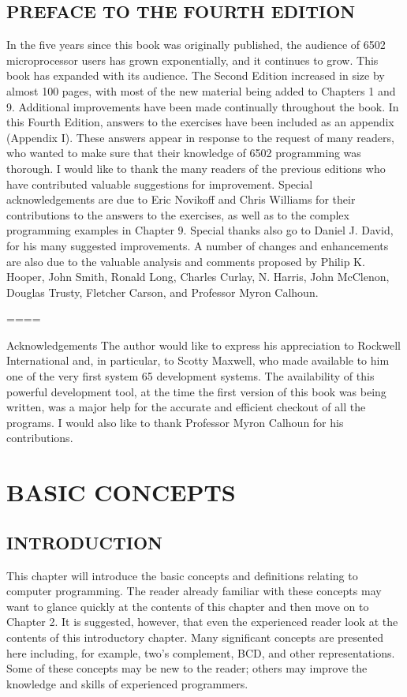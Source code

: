 \documentclass{book}
\begin{document}
\section*{PREFACE TO THE FOURTH EDITION}

In the five years since this book was originally published, the audience of 6502 microprocessor users has grown exponentially, and it continues
to grow. This book has expanded with its audience.
The Second Edition increased in size by almost 100 pages, with most of the new material being added to Chapters 1 and 9. Additional improvements have been made continually throughout the book. In this Fourth Edition, answers to the exercises have been included as an appendix (Appendix I). These answers appear in response to the request of many readers, who wanted to make sure that their knowledge of 6502 programming was thorough.
I would like to thank the many readers of the previous editions who have contributed valuable suggestions for improvement. Special acknowledgements are due to Eric Novikoff and Chris Williams for their contributions to the answers to the exercises, as well as to the complex programming examples in Chapter 9. Special thanks also go to Daniel J. David, for his many suggested improvements. A number of changes and enhancements are also due to the valuable analysis and comments proposed by Philip K. Hooper, John Smith, Ronald Long, Charles Curlay, N. Harris, John McClenon, Douglas Trusty, Fletcher Carson, and Professor Myron Calhoun.

====

Acknowledgements
The author would like to express his appreciation to Rockwell International and, in particular, to Scotty Maxwell, who made available to him one of the very first system 65 development systems. The availability of this powerful development tool, at the time the first version of this book was being written, was a major help for the accurate and efficient checkout of all the programs. I would also like to thank Professor Myron Calhoun for his contributions.


\chapter{BASIC CONCEPTS}

\section*{INTRODUCTION}

This chapter will introduce the basic concepts and definitions relating to computer programming. The reader already familiar with these concepts may want to glance quickly at the contents of this chapter and then move on to Chapter 2. It is suggested, however, that even the experienced reader look at the contents of this introductory chapter. Many significant concepts are presented here including, for example, two's complement, BCD, and other representations. Some of these concepts may be new to the reader; others may improve the knowledge and skills of experienced programmers.
\end{document}
